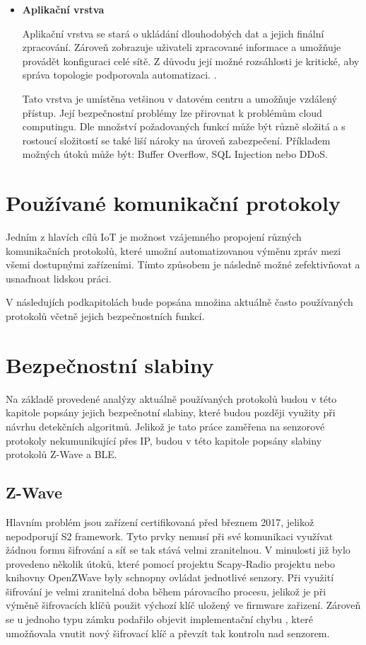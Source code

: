 \begin{itemize}
 \item \textbf{Aplikační vrstva}
 
 Aplikační vrstva se stará o ukládání dlouhodobých dat a jejich finální zpracování. 
 Zároveň zobrazuje uživateli zpracované informace a umožňuje provádět konfiguraci
 celé sítě. Z důvodu její možné rozsáhlosti je kritické, aby správa
 topologie podporovala automatizaci. \cite{secFramework}.
 
 Tato vrstva je umístěna vetšinou v datovém centru a umožňuje vzdálený přístup. 
 Její bezpečnostní problémy lze přirovnat k problémům cloud computingu. Dle
 množství požadovaných funkcí může být různě složitá a s rostoucí složitostí
 se také liší nároky na úroveň zabezpečení. Příkladem možných útoků může být:
 Buffer Overflow, SQL Injection nebo DDoS.
 
\end{itemize}
 
 \newpage
 
 \section{Používané komunikační protokoly} \label{protokoly}
 Jedním z hlavích cílů IoT je možnost vzájemného propojení různých komunikačních protokolů, 
 které umožní automatizovanou výměnu zpráv mezi všemi dostupnými zařízeními. Tímto způsobem
 je následně možné zefektivňovat a usnaďnoat lidskou práci.
 
 V následujích podkapitolách bude popsána množina aktuálně často používaných protokolů
 včetně jejich bezpečnostních funkcí.
 
  
   
   \newpage
  \section{Bezpečnostní slabiny}
  Na základě provedené analýzy aktuálně používaných protokolů budou v této kapitole 
  popsány jejich bezpečnotní slabiny, které budou později využity při návrhu 
  detekčních algoritmů. Jelikož je tato práce zaměřena na senzorové protokoly 
  nekumunikující přes IP, budou v této kapitole popsány slabiny protokolů 
  Z-Wave a BLE.
  
 \subsection{Z-Wave}
 Hlavním problém jsou zařízení certifikovaná před březnem 2017, jelikož nepodporují S2 framework.
 Tyto prvky nemusí při své komunikaci využívat žádnou formu šifrování a síť se tak stává 
 velmi zranitelnou. V minulosti již bylo provedeno několik útoků, které pomocí projektu
 Scapy-Radio projektu \cite{ezwave} nebo knihovny OpenZWave  byly schnopny ovládat jednotlivé senzory. 
 Při využití šifrování je velmi zranitelná doba během párovacího procesu, jelikož je při výměně
 šifrovacích klíčů použit výchozí klíč uložený ve firmware zařizení. Zároveň se 
 u jednoho typu zámku podařilo objevit implementační chybu \cite{zwave-S0-attack}, které umožňovala vnutit 
 nový šifrovací klíč a převzít tak kontrolu nad senzorem. 
 
